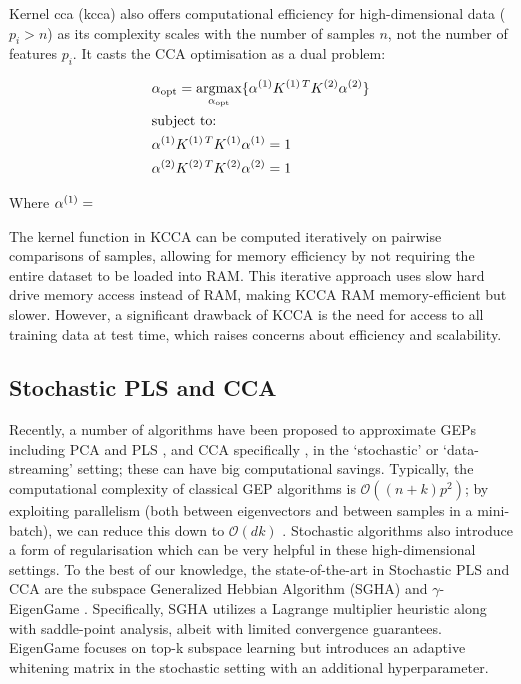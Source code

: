 Kernel \acrshort{cca} (\acrshort{kcca}) also offers computational efficiency for high-dimensional data (\(p_i>n\)) as its complexity scales with the number of samples \(n\), not the number of features \(p_i\).
It casts the CCA optimisation as a dual problem:

\begin{align}
    & \alpha_{\text{opt}}=\underset{\alpha_{\text{opt}}}{\mathrm{argmax}}\{ \alpha^{(1)}K^{(1)\,T}K^{(2)}\alpha^{(2)}  \} \\
    & \text{subject to:} \notag                                                                                            \\
    & \alpha^{(1)}K^{(1)\,T}K^{(1)}\alpha^{(1)}=1 \notag                                                                  \\
    & \alpha^{(2)}K^{(2)\,T}K^{(2)}\alpha^{(2)}=1 \notag
\end{align}

Where \(\alpha^{(1)}=\)

The kernel function in KCCA can be computed iteratively on pairwise comparisons of samples, allowing for memory efficiency by not requiring the entire dataset to be loaded into RAM.
This iterative approach uses slow hard drive memory access instead of RAM, making KCCA RAM memory-efficient but slower.
However, a significant drawback of KCCA is the need for access to all training data at test time, which raises concerns about efficiency and scalability.

\subsection{Stochastic PLS and CCA}
Recently, a number of algorithms have been proposed to approximate GEPs including PCA and PLS \citep{arora2012stochastic}, and CCA specifically \citep{bhatia2018gen}, in the `stochastic' or `data-streaming' setting; these can have big computational savings.
Typically, the computational complexity of classical GEP algorithms is $\mathcal{O}\left((n + k)p^2\right)$; by exploiting parallelism (both between eigenvectors and between samples in a mini-batch), we can reduce this down to $\mathcal{O}\left(d k \right)$ \citep{arora2016stochastic}.
Stochastic algorithms also introduce a form of regularisation which can be very helpful in these high-dimensional settings.
To the best of our knowledge, the state-of-the-art in Stochastic PLS and CCA are the subspace Generalized Hebbian Algorithm (SGHA) \citep{chen2019constrained} and $\gamma$-EigenGame \citep{gemp20,gemp2021}.
Specifically, SGHA utilizes a Lagrange multiplier heuristic along with saddle-point analysis, albeit with limited convergence guarantees.
EigenGame focuses on top-k subspace learning but introduces an adaptive whitening matrix in the stochastic setting with an additional hyperparameter.

